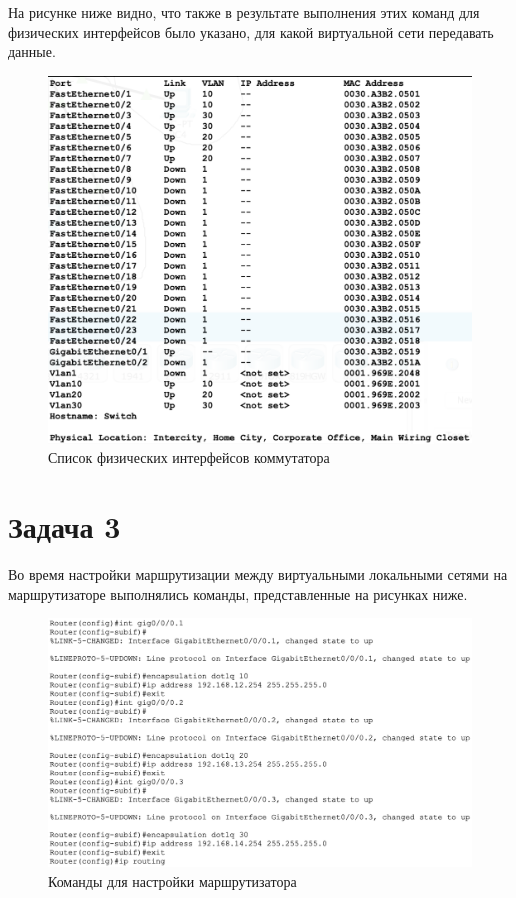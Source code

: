 На рисунке ниже видно, что также в результате выполнения этих команд для физических интерфейсов было указано, для какой виртуальной сети передавать данные.

\begin{figure}[H]
    \centering
    \includegraphics[width=1\textwidth]{images/switch-int.png}
    \caption{Список физических интерфейсов коммутатора}
    \label{fig:router7}
\end{figure}

\section{Задача 3}%
\label{sec:3}

Во время настройки маршрутизации между виртуальными локальными сетями на маршрутизаторе выполнялись команды, представленные на рисунках ниже.

\begin{figure}[H]
    \centering
    \includegraphics[width=1\textwidth]{images/task-3.png}
    \caption{Команды для настройки маршрутизатора}
    \label{fig:router7}
\end{figure}

